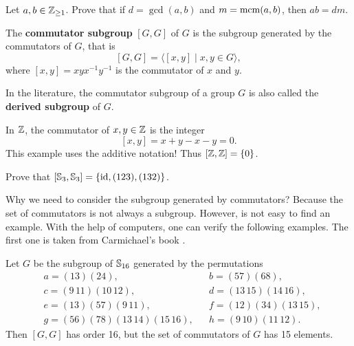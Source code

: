 \begin{exercise}
Let $a,b\in\mathbb{Z}_{\geq1}$. Prove that if $d=\gcd(a,b)$ and $m=\mathrm{mcm}(a,b)$, then 
$ab=dm$.
\end{exercise}


\begin{definition}
        The \textbf{commutator subgroup}
        $[G,G]$ of $G$ 
        is the subgroup generated by 
        the commutators of $G$, that is 
        \[
        [G,G]=\langle[x,y]\mid x,y\in G\rangle,
        \]
        where $[x,y]=xyx^{-1}y^{-1}$ is the commutator of 
        $x$ and $y$.
\end{definition}
  
In the literature, the commutator subgroup of a group $G$ is also called the \textbf{derived 
subgroup} of $G$. 
       
\begin{example}
        In $\mathbb{Z}$, the commutator of $x,y\in \mathbb{Z}$ 
        is the integer
        \[
        [x,y]=x+y-x-y=0.
        \]
        This example uses the additive notation! 
        Thus $[\mathbb{Z},\mathbb{Z}]=\{0\}$. 
\end{example}
        
\begin{exercise}
        Prove that $[\mathbb{S}_3,\mathbb{S}_3]=\{\operatorname{id},(123),(132)\}$.
\end{exercise}
        
Why we need to consider the subgroup 
generated by commutators? Because the set of commutators 
is not always a subgroup. However, is not easy to find 
an example. With the help of computers, 
one can verify the following examples. 
The first one is taken from Carmichael's book
\cite{MR0075938}.

\begin{example}
        Let $G$ be the subgroup of $\mathbb{S}_{16}$ 
        generated by the permutations 
        \begin{align*}
&a = (13)(24),&&
b = (57)(68),\\
&c = (9\,11)(10\,12),&&
d = (13\,15)(14\,16),\\
&e = (13)(57)(9\,11),&&
f = (12)(34)(13\,15),\\
&g = (56)(78)(13\,14)(15\,16),&&
h = (9\,10)(11\,12).
\end{align*}
Then $[G,G]$ has order 16, but the set of commutators of 
$G$ has 15 elements. 
\end{example}

